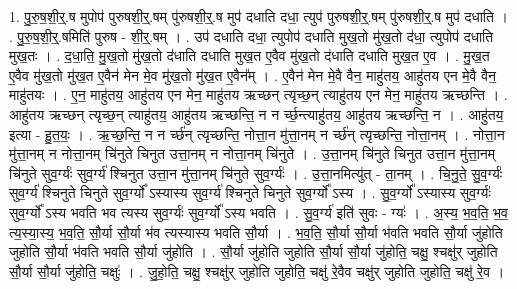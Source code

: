 \documentclass[17pt]{extarticle}
\begin{document}
1. पु॒रु॒ष॒शी॒र्॒.ष मुपोप॑ पुरुषशी॒र्॒.षम् पु॑रुषशी॒र्॒.ष मुप॑ दधाति दधा॒ त्युप॑ पुरुषशी॒र्॒.षम् पु॑रुषशी॒र्॒.ष मुप॑ दधाति । . पु॒रु॒ष॒शी॒र्॒.षमिति॑ पुरुष - शी॒र्॒.षम् । . उप॑ दधाति दधा॒ त्युपोप॑ दधाति मुख॒तो मु॑ख॒तो द॑धा॒ त्युपोप॑ दधाति मुख॒तः । . द॒धा॒ति॒ मु॒ख॒तो मु॑ख॒तो द॑धाति दधाति मुख॒त ए॒वैव मु॑ख॒तो द॑धाति दधाति मुख॒त ए॒व । . मु॒ख॒त ए॒वैव मु॑ख॒तो मु॑ख॒त ए॒वैन॑ मेन मे॒व मु॑ख॒तो मु॑ख॒त ए॒वैन᳚म् । . ए॒वैन॑ मेन मे॒वै वैन॒ माहु॑तय॒ आहु॑तय एन मे॒वै वैन॒ माहु॑तयः । . ए॒न॒ माहु॑तय॒ आहु॑तय एन मेन॒ माहु॑तय ऋच्छन् त्यृच्छ॒न् त्याहु॑तय एन मेन॒ माहु॑तय ऋच्छन्ति । . आहु॑तय ऋच्छन् त्यृच्छ॒न् त्याहु॑तय॒ आहु॑तय ऋच्छन्ति॒ न न र्च्छ॒न्त्याहु॑तय॒ आहु॑तय ऋच्छन्ति॒ न । . आहु॑तय॒ इत्या - हु॒त॒यः॒ । . ऋ॒च्छ॒न्ति॒ न न र्च्छ॑न् त्यृच्छन्ति॒ नोत्ता॒न मु॑त्ता॒नम् न र्च्छ॑न् त्यृच्छन्ति॒ नोत्ता॒नम् । . नोत्ता॒न मु॑त्ता॒नम् न नोत्ता॒नम् चि॑नुते चिनुत उत्ता॒नम् न नोत्ता॒नम् चि॑नुते । . उ॒त्ता॒नम् चि॑नुते चिनुत उत्ता॒न मु॑त्ता॒नम् चि॑नुते सुव॒र्ग्यः॑ सुव॒र्ग्य॑ श्चिनुत उत्ता॒न मु॑त्ता॒नम् चि॑नुते सुव॒र्ग्यः॑ । . उ॒त्ता॒नमित्यु॑त् - ता॒नम् । . चि॒नु॒ते॒ सु॒व॒र्ग्यः॑ सुव॒र्ग्य॑ श्चिनुते चिनुते सुव॒र्ग्यो᳚ ऽस्यास्य सुव॒र्ग्य॑ श्चिनुते चिनुते सुव॒र्ग्यो᳚ ऽस्य । . सु॒व॒र्ग्यो᳚ ऽस्यास्य सुव॒र्ग्यः॑ सुव॒र्ग्यो᳚ ऽस्य भवति भव त्यस्य सुव॒र्ग्यः॑ सुव॒र्ग्यो᳚ ऽस्य भवति । . सु॒व॒र्ग्य॑ इति॑ सुवः - ग्यः॑ । . अ॒स्य॒ भ॒व॒ति॒ भ॒व॒ त्य॒स्या॒स्य॒ भ॒व॒ति॒ सौ॒र्या सौ॒र्या भ॑व त्यस्यास्य भवति सौ॒र्या । . भ॒व॒ति॒ सौ॒र्या सौ॒र्या भ॑वति भवति सौ॒र्या जु॑होति जुहोति सौ॒र्या भ॑वति भवति सौ॒र्या जु॑होति । . सौ॒र्या जु॑होति जुहोति सौ॒र्या सौ॒र्या जु॑होति॒ चक्षु॒ श्चक्षु॑र् जुहोति सौ॒र्या सौ॒र्या जु॑होति॒ चक्षुः॑ । . जु॒हो॒ति॒ चक्षु॒ श्चक्षु॑र् जुहोति जुहोति॒ चक्षु॑ रे॒वैव चक्षु॑र् जुहोति जुहोति॒ चक्षु॑ रे॒व । \newline
\end{document}
